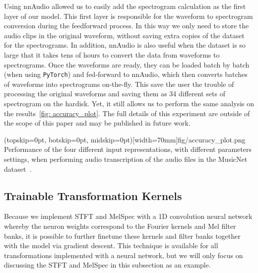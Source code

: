 \documentclass{ieeeaccess}
\newcommand{\nbh}[1]{\texttt{#1}}
\begin{document}
Using nnAudio allowed us to easily add the spectrogram calculation as the first layer of our model. This first layer is responsible for the waveform to spectrogram conversion during the feedforward process. In this way we only need to store the audio clips in the original waveform, without saving extra copies of the dataset for the spectrograms. In addition, nnAudio is also useful when the dataset is so large that it takes tens of hours to convert the data from waveforms to spectrograms. Once the waveforms are ready, they can be loaded batch by batch (when using \nbh{PyTorch}) and fed-forward to nnAudio, which then converts batches of waveforms into spectrograms on-the-fly. This save the user the trouble of processing the original waveforms and saving them as 34 different sets of spectrogram on the hardisk. Yet, it still allows us to perform the same analysis on the results~\ref{fig: accuracy_plot}. The full details of this experiment are outside of the scope of this paper and may be published in future work. 

\Figure(topskip=0pt, botskip=0pt, midskip=0pt)[width=70mm]{fig/accuracy_plot.png}
{Performance of the four different input representations, with different parameters settings, when performing audio transcription of the audio files in the MusicNet dataset~\cite{thickstun2017learning, thickstun2018invariances}.  \label{fig: accuracy_plot}}


\subsection{Trainable Transformation Kernels}\label{subsec:trainable}
Because we implement STFT and MelSpec with a 1D convolution neural network whereby the neuron weights correspond to the Fourier kernels and Mel filter banks, it is possible to further finetune these kernels and filter banks together with the model via gradient descent. This technique is available for all transformations implemented with a neural network, but we will only focus on discussing the STFT and MelSpec in this subsection as an example.
\end{document}
